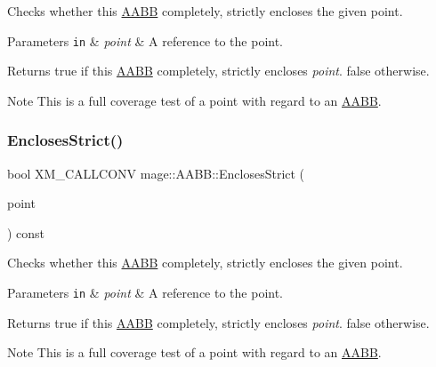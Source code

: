 Checks whether this \hyperlink{structmage_1_1_a_a_b_b}{A\+A\+BB} completely, strictly encloses the given point.


\begin{DoxyParams}[1]{Parameters}
\mbox{\tt in}  & {\em point} & A reference to the point. \\
\hline
\end{DoxyParams}
\begin{DoxyReturn}{Returns}
{\ttfamily true} if this \hyperlink{structmage_1_1_a_a_b_b}{A\+A\+BB} completely, strictly encloses {\itshape point}. {\ttfamily false} otherwise. 
\end{DoxyReturn}
\begin{DoxyNote}{Note}
This is a full coverage test of a point with regard to an \hyperlink{structmage_1_1_a_a_b_b}{A\+A\+BB}. 
\end{DoxyNote}
\hypertarget{structmage_1_1_a_a_b_b_aa8946038ce497c79fa0ee34e87aa9aed}{}\label{structmage_1_1_a_a_b_b_aa8946038ce497c79fa0ee34e87aa9aed} 
\subsubsection{\texorpdfstring{Encloses\+Strict()}{EnclosesStrict()}\hspace{0.1cm}{\footnotesize\ttfamily [2/4]}}
{\footnotesize\ttfamily bool X\+M\+\_\+\+C\+A\+L\+L\+C\+O\+NV mage\+::\+A\+A\+B\+B\+::\+Encloses\+Strict (\begin{DoxyParamCaption}\item[{F\+X\+M\+V\+E\+C\+T\+OR}]{point }\end{DoxyParamCaption}) const\hspace{0.3cm}{\ttfamily [noexcept]}}

Checks whether this \hyperlink{structmage_1_1_a_a_b_b}{A\+A\+BB} completely, strictly encloses the given point.


\begin{DoxyParams}[1]{Parameters}
\mbox{\tt in}  & {\em point} & A reference to the point. \\
\hline
\end{DoxyParams}
\begin{DoxyReturn}{Returns}
{\ttfamily true} if this \hyperlink{structmage_1_1_a_a_b_b}{A\+A\+BB} completely, strictly encloses {\itshape point}. {\ttfamily false} otherwise. 
\end{DoxyReturn}
\begin{DoxyNote}{Note}
This is a full coverage test of a point with regard to an \hyperlink{structmage_1_1_a_a_b_b}{A\+A\+BB}. 
\end{DoxyNote}
\hypertarget{structmage_1_1_a_a_b_b_af037df0800e1e8c3564363f154c2424a}{}\label{structmage_1_1_a_a_b_b_af037df0800e1e8c3564363f154c2424a} 
